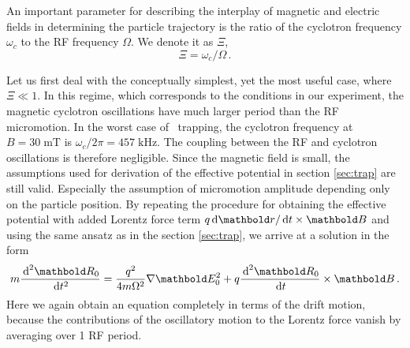 An important parameter for describing the interplay of magnetic
and electric fields in determining the particle trajectory is
the ratio of the cyclotron frequency $\omega_c$ to the \ac{RF}
frequency $\Omega$. We denote it as $\Xi$,
\begin{equation}
\Xi = \omega_c/\Omega\,.
\end{equation}

Let us first deal with the conceptually simplest, yet the most
useful case, where $\Xi \ll 1$. In this regime, which corresponds
to the conditions in our experiment, the magnetic
cyclotron oscillations have much larger period than the \ac{RF}
micromotion. In the worst case of \Hminus\ trapping,
the cyclotron frequency at $B=30\;\text{mT}$ is
$\omega_c/2\pi=457\;\text{kHz}$. The coupling between the \ac{RF}
 and cyclotron oscillations is therefore negligible. Since the
magnetic field is small, the assumptions used for derivation
of the effective potential in section \ref{sec:trap} are still
valid. Especially the assumption of micromotion amplitude
depending only on the particle position. By repeating the procedure
for obtaining the effective potential with added Lorentz
force term $q\de\mb r/\de t\times \mb B$ and using the same
ansatz as in the section \ref{sec:trap}, we arrive
at a solution in the form
\begin{equation}
m\frac{\de^2\mb R_0}{\de t^2} =
\frac{q^2}{4m\Omega^2}\nabla\mb E_0^2 +
q\frac{\de^2 \mb R_0}{\de t}\times \mb B\,.
\label{eq:esmpt:secular}
\end{equation}
Here we again obtain an equation completely in terms of the
drift motion, because the contributions of the oscillatory
motion to the Lorentz force vanish by averaging over 1 \ac{RF}
period.

